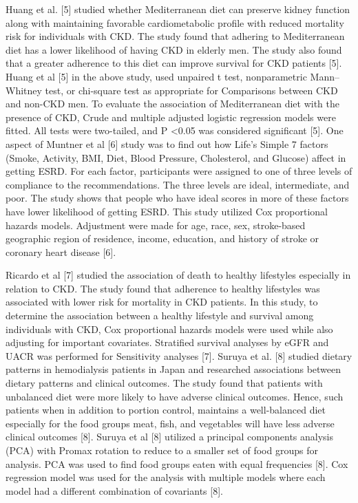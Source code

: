 \medskip
\noindent Huang et al. [5] studied whether Mediterranean diet can preserve kidney function along with maintaining favorable cardiometabolic profile with reduced mortality risk for individuals with CKD. The study found that adhering to Mediterranean diet has a lower likelihood of having CKD in elderly men. The study also found that a greater adherence to this diet can improve survival for CKD patients [5]. Huang et al [5] in the above study, used unpaired t test, nonparametric Mann–Whitney test, or chi-square test as appropriate for Comparisons between CKD and non-CKD men. To evaluate the association of Mediterranean diet with the presence of CKD, Crude and multiple adjusted logistic regression models were fitted. All tests were two-tailed, and P \textless 0.05 was considered significant [5]. One aspect of Muntner et al [6] study was to find out how Life’s Simple 7 factors (Smoke, Activity, BMI, Diet, Blood Pressure, Cholesterol, and Glucose) affect in getting ESRD. For each factor, participants were assigned to one of  three levels of compliance to the recommendations. The three levels are ideal, intermediate, and poor. The study shows that people who have ideal scores in more of these factors have lower likelihood of getting ESRD. This study utilized Cox proportional hazards models. Adjustment were made for age, race, sex, stroke-based geographic region of residence, income, education, and history of stroke or coronary heart disease [6].


\medskip
\noindent  Ricardo et al [7] studied the association of death to healthy lifestyles especially in relation to CKD. The study found that adherence to healthy lifestyles was associated with lower risk for mortality in CKD patients. In this study, to determine the association between a healthy lifestyle and survival among individuals with CKD, Cox proportional hazards models were used while also adjusting for important covariates. Stratified survival analyses by eGFR and UACR was performed for Sensitivity analyses [7]. Suruya et al. [8] studied dietary patterns in hemodialysis patients in Japan and researched associations between dietary patterns and clinical outcomes. The study found that patients with unbalanced diet were more likely to have adverse clinical outcomes. Hence, such patients when in addition to portion control, maintains a well-balanced diet especially for the food groups meat, fish, and vegetables will have less adverse clinical outcomes [8]. Suruya et al [8] utilized a principal components analysis (PCA) with Promax rotation to reduce to a smaller set of food groups for analysis. PCA was used to find food groups eaten with equal frequencies [8]. Cox regression model was used for the analysis with multiple models where each model had a different combination of covariants [8].

